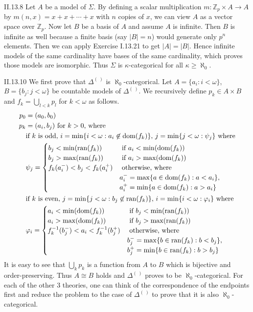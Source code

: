 \documentclass[12pt]{article}
\begin{document}
\begin{customthm}{II.13.8}
  Let $A$ be a model of $\Sigma$. By defining a scalar multiplication $m:\mathbb{Z}_p\times A\rightarrow A$ by $m(n,x)=x+x+\cdots+x$ with $n$ copies of $x$, we can view $A$ as a vector space over $\mathbb{Z}_p$. Now let $B$ be a basis of $A$ and assume $A$ is infinite. Then $B$ is infinite as well because a finite basis (say $|B|=n$) would generate only $p^n$ elements. Then we can apply Exercise I.13.21 to get $|A|=|B|$. Hence infinite models of the same cardinality have bases of the same cardinality, which proves those models are isomorphic. Thus $\Sigma$ is $\kappa$-categorical for all $\kappa\geq\aleph_0$.
\end{customthm}

\begin{customthm}{II.13.10}
  We first prove that $\Delta^{(~)}$ is $\aleph_0$-categorical. Let $A=\{a_i:i<\omega\}$, $B=\{b_j:j<\omega\}$ be countable models of $\Delta^{(~)}$. We recursively define $p_k\in A\times B$ and $f_k=\bigcup_{l<k}p_l$ for $k<\omega$ as follows.
  \begin{align*}
    p_0 &= (a_0, b_0) \\
    p_k &= (a_i, b_j) \text{ for } k>0 \text{, where} \\
    &\text{if } k \text{ is odd, } i=\min\{i<\omega:a_i\not\in\mathop{\mathrm{dom}}(f_k)\} \text{, } j=\min\{j<\omega:\psi_j\} \text{ where} \\
    &\psi_j=
    \begin{cases}
      b_j<\min(\mathop{\mathrm{ran}}(f_k)) &\text{ if } a_i<\min(\mathop{\mathrm{dom}}(f_k)) \\
      b_j>\max(\mathop{\mathrm{ran}}(f_k)) &\text{ if } a_i>\max(\mathop{\mathrm{dom}}(f_k)) \\
      f_k(a_i^-)<b_j<f_k(a_i^+) &\text{ otherwise, where } \\
      &a_i^-=\max\{a\in\mathop{\mathrm{dom}}(f_k):a<a_i\}, \\ &a_i^+=\min\{a\in\mathop{\mathrm{dom}}(f_k):a>a_i\}
    \end{cases} \\
    &\text{if } k \text{ is even, } j=\min\{j<\omega:b_j\not\in\mathop{\mathrm{ran}}(f_k)\} \text{, } i=\min\{i<\omega:\varphi_i\} \text{ where} \\
    &\varphi_i=
    \begin{cases}
      a_i<\min(\mathop{\mathrm{dom}}(f_k)) &\text{ if } b_j<\min(\mathop{\mathrm{ran}}(f_k)) \\
      a_i>\max(\mathop{\mathrm{dom}}(f_k)) &\text{ if } b_j>\max(\mathop{\mathrm{ran}}(f_k)) \\
      f_k^{-1}(b_j^-)<a_i<f_k^{-1}(b_j^+) &\text{ otherwise, where } \\
      &b_j^-=\max\{b\in\mathop{\mathrm{ran}}(f_k):b<b_j\}, \\ &b_j^+=\min\{b\in\mathop{\mathrm{ran}}(f_k):b>b_j\}
    \end{cases}
  \end{align*}
  It is easy to see that $\bigcup_kp_k$ is a function from $A$ to $B$ which is bijective and order-preserving. Thus $A\cong B$ holds and $\Delta^{(~)}$ proves to be $\aleph_0$-categorical. For each of the other 3 theories, one can think of the correspondence of the endpoints first and reduce the problem to the case of $\Delta^{(~)}$ to prove that it is also $\aleph_0$-categorical.


\end{customthm}
\end{document}
